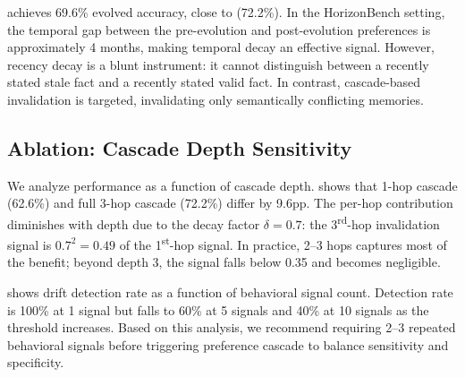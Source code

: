 \recencydecay achieves 69.6\% evolved accuracy, close to \fullcascade (72.2\%). In the HorizonBench setting, the temporal gap between the pre-evolution and post-evolution preferences is approximately 4 months, making temporal decay an effective signal. However, recency decay is a blunt instrument: it cannot distinguish between a recently stated stale fact and a recently stated valid fact. In contrast, cascade-based invalidation is targeted, invalidating only semantically conflicting memories.

\begin{table}[t]
\centering
\caption{Drift cascade comparison on 227 evolved and 100 static \horizonbench items.
\fullcascade achieves the highest evolved accuracy (+32.2pp over \flatmemory) while preserving static accuracy.
Lower distractor selection rate indicates better suppression of stale preference belief.
All results computed over the same 327 items with random seed 42.}
\label{tab:horizonbench}
\end{table}

\subsection{Ablation: Cascade Depth Sensitivity}
\label{sec:results:ablation}

We analyze performance as a function of cascade depth.  shows that 1-hop cascade (62.6\%) and full 3-hop cascade (72.2\%) differ by 9.6pp. The per-hop contribution diminishes with depth due to the decay factor $\delta = 0.7$: the 3\textsuperscript{rd}-hop invalidation signal is $0.7^2 = 0.49$ of the 1\textsuperscript{st}-hop signal. In practice, 2--3 hops captures most of the benefit; beyond depth 3, the signal falls below 0.35 and becomes negligible.

 shows drift detection rate as a function of behavioral signal count. Detection rate is 100\% at 1 signal but falls to 60\% at 5 signals and 40\% at 10 signals as the threshold increases. Based on this analysis, we recommend requiring 2--3 repeated behavioral signals before triggering preference cascade to balance sensitivity and specificity.
